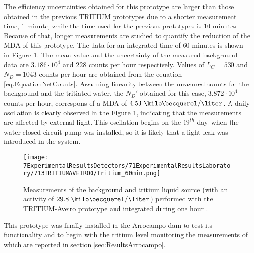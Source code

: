 The efficiency uncertainties obtained for this prototype are larger than those obtained in the previous TRITIUM prototypes due to a shorter measurement time, $1$ minute, while the time used for the previous prototypes is $10$ minutes. Because of that, longer measurements are studied to quantify the reduction of the MDA of this prototype. The data for an integrated time of $60$ minutes is shown in Figure \ref{fig:Tritium60min}. The mean value and the uncertainty of the measured background data are $3.186 \cdot{} 10^{4}$ and $228$ counts per hour respectively. Values of $L_C=530$ and $N_D=1043$ counts per hour are obtained from the equation \ref{eq:EquationNetCounts}. Assuming linearity between the measured counts for the background and the tritiated water, the $N_D'$ obtained for this case, $3.872\cdot{}10^4$ counts per hour,  correspons of a MDA of $4.53~\kilo\becquerel/\liter$. A daily oscilation is clearly observed in the Figure \ref{fig:Tritium60min}, indicating that the measurements are affected by external light. This oscilation begins on the $19^{th}$ day, when the water closed circuit pump was installed, so it is likely that a light leak was introduced in the system.

\begin{figure}[h]
\centering
\texttt{[image: 7ExperimentalResultsDetectors/71ExperimentalResultsLaboratory/713TRITIUMAVEIRO0/Tritium\_60min.png]}
\caption{Measurements of the background and tritium liquid source (with an activity of $29.8~\kilo\becquerel/\liter$) performed with the TRITIUM-Aveiro prototype and integrated during one hour \cite{ExperimentalPaperCarlos}.\label{fig:Tritium60min}}
\end{figure}

This prototype was finally installed in the Arrocampo dam to test its functionality and to begin with the tritium level monitoring the measurements of which are reported in section \ref{sec:ResultsArrocampo}.